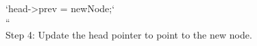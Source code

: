 \documentclass[preview]{standalone}
\begin{document}
`head->prev = newNode;`\\``\\Step 4: Update the head pointer to point to the new node.\\
\end{document}
